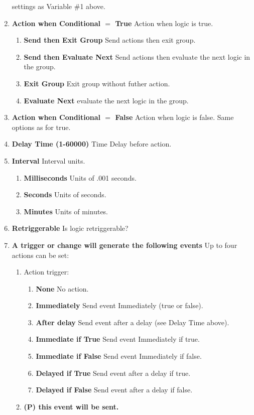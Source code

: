 \begin{enumerate}
settings as Variable \#1 above.
\item \textbf{Action when Conditional $=$ True} Action when logic is true.
\begin{enumerate}
\item \textbf{Send then Exit Group} Send actions then exit group.
\item \textbf{Send then Evaluate Next} Send actions then evaluate the next 
logic in the group.
\item \textbf{Exit Group} Exit group without futher action.
\item \textbf{Evaluate Next} evaluate the next logic in the group.
\end{enumerate}
\item \textbf{Action when Conditional $=$ False} Action when logic is false. 
Same options as for true.
\item \textbf{Delay Time (1-60000)} Time Delay before action.
\item \textbf{Interval} Interval units.
\begin{enumerate}
\item \textbf{Milliseconds} Units of .001 seconds.
\item \textbf{Seconds} Units of seconds.
\item \textbf{Minutes} Units of minutes.
\end{enumerate}
\item \textbf{Retriggerable} Is logic retriggerable?
\item \textbf{A trigger or change will generate the following events} Up to 
four actions can be set:
\begin{enumerate}
\item Action trigger:
\begin{enumerate}
\item \textbf{None} No action.
\item \textbf{Immediately} Send event Immediately (true or false).
\item \textbf{After delay} Send event after a delay (see Delay Time above).
\item \textbf{Immediate if True} Send event Immediately if true.
\item \textbf{Immediate if False} Send event Immediately if false.
\item \textbf{Delayed if True} Send event after a delay if true.
\item \textbf{Delayed if False} Send event after a delay if false.
\end{enumerate}
\item \textbf{(P) this event will be sent.}
\end{enumerate}
\end{enumerate}

